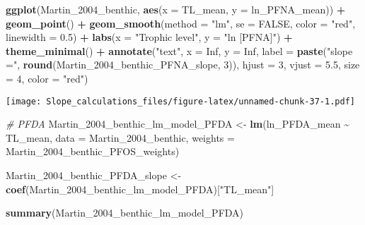 \documentclass[
]{article}
\newenvironment{Shaded}{\begin{snugshade}}{\end{snugshade}}
\newcommand{\AttributeTok}[1]{\textcolor[rgb]{0.13,0.29,0.53}{#1}}
\newcommand{\CommentTok}[1]{\textcolor[rgb]{0.56,0.35,0.01}{\textit{#1}}}
\newcommand{\ConstantTok}[1]{\textcolor[rgb]{0.56,0.35,0.01}{#1}}
\newcommand{\DecValTok}[1]{\textcolor[rgb]{0.00,0.00,0.81}{#1}}
\newcommand{\FloatTok}[1]{\textcolor[rgb]{0.00,0.00,0.81}{#1}}
\newcommand{\FunctionTok}[1]{\textcolor[rgb]{0.13,0.29,0.53}{\textbf{#1}}}
\newcommand{\NormalTok}[1]{#1}
\newcommand{\OtherTok}[1]{\textcolor[rgb]{0.56,0.35,0.01}{#1}}
\newcommand{\SpecialCharTok}[1]{\textcolor[rgb]{0.81,0.36,0.00}{\textbf{#1}}}
\newcommand{\StringTok}[1]{\textcolor[rgb]{0.31,0.60,0.02}{#1}}
\begin{document}
\begin{Shaded}
\begin{Highlighting}[]
\FunctionTok{ggplot}\NormalTok{(Martin\_2004\_benthic, }\FunctionTok{aes}\NormalTok{(}\AttributeTok{x =}\NormalTok{ TL\_mean, }\AttributeTok{y =}\NormalTok{ ln\_PFNA\_mean)) }\SpecialCharTok{+}
  \FunctionTok{geom\_point}\NormalTok{() }\SpecialCharTok{+}
  \FunctionTok{geom\_smooth}\NormalTok{(}\AttributeTok{method =} \StringTok{"lm"}\NormalTok{, }\AttributeTok{se =} \ConstantTok{FALSE}\NormalTok{, }\AttributeTok{color =} \StringTok{"red"}\NormalTok{, }\AttributeTok{linewidth =} \FloatTok{0.5}\NormalTok{) }\SpecialCharTok{+}
  \FunctionTok{labs}\NormalTok{(}\AttributeTok{x =} \StringTok{"Trophic level"}\NormalTok{,}
       \AttributeTok{y =} \StringTok{"ln [PFNA]"}\NormalTok{) }\SpecialCharTok{+}
  \FunctionTok{theme\_minimal}\NormalTok{() }\SpecialCharTok{+}
  \FunctionTok{annotate}\NormalTok{(}\StringTok{"text"}\NormalTok{, }\AttributeTok{x =} \ConstantTok{Inf}\NormalTok{, }\AttributeTok{y =} \ConstantTok{Inf}\NormalTok{, }\AttributeTok{label =} \FunctionTok{paste}\NormalTok{(}\StringTok{"slope ="}\NormalTok{, }\FunctionTok{round}\NormalTok{(Martin\_2004\_benthic\_PFNA\_slope, }\DecValTok{3}\NormalTok{)), }
           \AttributeTok{hjust =} \DecValTok{3}\NormalTok{, }\AttributeTok{vjust =} \FloatTok{5.5}\NormalTok{, }\AttributeTok{size =} \DecValTok{4}\NormalTok{, }\AttributeTok{color =} \StringTok{"red"}\NormalTok{)}
\end{Highlighting}
\end{Shaded}

\texttt{[image: Slope\_calculations\_files/figure-latex/unnamed-chunk-37-1.pdf]}

\begin{Shaded}
\begin{Highlighting}[]
\CommentTok{\# PFDA}
\NormalTok{Martin\_2004\_benthic\_lm\_model\_PFDA }\OtherTok{\textless{}{-}} \FunctionTok{lm}\NormalTok{(ln\_PFDA\_mean }\SpecialCharTok{\textasciitilde{}}\NormalTok{ TL\_mean, }
                                        \AttributeTok{data =}\NormalTok{ Martin\_2004\_benthic,}
                                        \AttributeTok{weights =}\NormalTok{ Martin\_2004\_benthic\_PFOS\_weights)}

\NormalTok{Martin\_2004\_benthic\_PFDA\_slope }\OtherTok{\textless{}{-}} \FunctionTok{coef}\NormalTok{(Martin\_2004\_benthic\_lm\_model\_PFDA)[}\StringTok{"TL\_mean"}\NormalTok{]}

\FunctionTok{summary}\NormalTok{(Martin\_2004\_benthic\_lm\_model\_PFDA)}
\end{Highlighting}
\end{Shaded}
\end{document}

